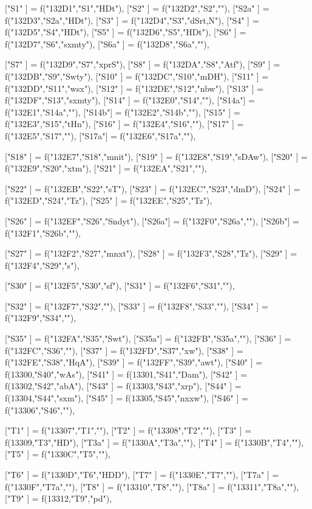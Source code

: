 {["S1"  ] = f("132D1","S1","HDt"),
["S2"  ] = f("132D2","S2",""),
["S2a" ] = f("132D3","S2a","HDt"),
["S3"  ] = f("132D4","S3","dSrt,N"),
["S4"  ] = f("132D5","S4","HDt"),
["S5"  ] = f("132D6","S5","HDt"),
["S6"  ] = f("132D7","S6","sxmty"),
["S6a" ] = f("132D8","S6a",""),

["S7"  ] = f("132D9","S7","xprS"),
["S8"  ] = f("132DA","S8","Atf"),
["S9"  ] = f("132DB","S9","Swty"),
["S10" ] = f("132DC","S10","mDH"),
["S11" ] = f("132DD","S11","wsx"),
["S12" ] = f("132DE","S12","nbw"),
["S13" ] = f("132DF","S13","sxmty"),
["S14" ] = f("132E0","S14",""),
["S14a"] = f("132E1","S14a",""),
["S14b"] = f("132E2","S14b",""),
["S15" ] = f("132E3","S15","tHn"),
["S16" ] = f("132E4","S16",""),
["S17" ] = f("132E5","S17",""),
["S17a"] = f("132E6","S17a",""),

["S18" ] = f("132E7","S18","mnit"),
["S19" ] = f("132E8","S19","sDAw"),
["S20" ] = f("132E9","S20","xtm"),
["S21" ] = f("132EA","S21",""),

["S22" ] = f("132EB","S22","sT"),
["S23" ] = f("132EC","S23","dmD"),
["S24" ] = f("132ED","S24","Tz"),
["S25" ] = f("132EE","S25","Tz"),

["S26" ] = f("132EF","S26","Sndyt"),
["S26a"] = f("132F0","S26a",""),
["S26b"] = f("132F1","S26b",""),

["S27" ] = f("132F2","S27","mnxt"),
["S28" ] = f("132F3","S28","Tz"),
["S29" ] = f("132F4","S29","s"),

["S30" ] = f("132F5","S30","sf"),
["S31" ] = f("132F6","S31",""),

["S32" ] = f("132F7","S32",""),
["S33" ] = f("132F8","S33",""),
["S34" ] = f("132F9","S34",""),

["S35" ] = f("132FA","S35","Swt"),
["S35a"] = f("132FB","S35a",""),
["S36" ] = f("132FC","S36",""),
["S37" ] = f("132FD","S37","xw"),
["S38" ] = f("132FE","S38","HqA"),
["S39" ] = f("132FF","S39","awt"),
["S40" ] = f(13300,"S40","wAs"),
["S41" ] = f(13301,"S41","Dam"),
["S42" ] = f(13302,"S42","abA"),
["S43" ] = f(13303,"S43","xrp"),
["S44" ] = f(13304,"S44","sxm"),
["S45" ] = f(13305,"S45","nxxw"),
["S46" ] = f("13306","S46",""),

["T1"  ] = f("13307","T1",""),
["T2"  ] = f("13308","T2",""),
["T3"  ] = f(13309,"T3","HD"),
["T3a" ] = f("1330A","T3a",""),
["T4"  ] = f("1330B","T4",""),
["T5"  ] = f("1330C","T5",""),

["T6"  ] = f("1330D","T6","HDD"),
["T7"  ] = f("1330E","T7",""),
["T7a" ] = f("1330F","T7a",""),
["T8"  ] = f("13310","T8",""),
["T8a" ] = f("13311","T8a",""),
["T9"  ] = f(13312,"T9","pd"),

}
